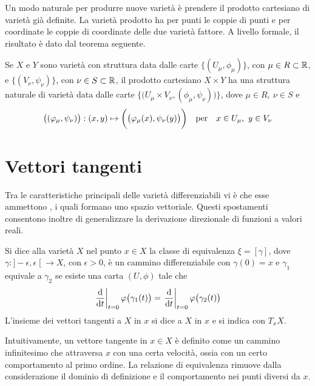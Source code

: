 Un modo naturale per produrre nuove varietà è prendere il prodotto cartesiano di varietà già definite. La varietà prodotto ha per punti le coppie di punti e per coordinate le coppie di coordinate delle due varietà fattore. A livello formale, il risultato è dato dal teorema seguente.
\begin{theorem}
  Se $X$ e $Y$ sono varietà con struttura data dalle carte $\big\lbrace(U_{\mu}, \phi_{\mu})\big\rbrace$, con $\mu \in R \subset \mathbb{R}$, e $\big\lbrace (V_{\nu}, \psi_{\nu})\big\rbrace$, con $\nu \in S \subset  \mathbb{R}$, il prodotto cartesiano $X \times Y$ ha una struttura naturale di varietà data dalle carte $\Big\lbrace\big( U_{\mu} \times V_{\nu}, (\phi_{\mu},\psi_{\nu})\big)\Big\rbrace$, dove $\mu \in  R,\ \nu \in S$ e \begin{equation*}
    \big((\phi_{\mu},\psi_{\nu})\big): (x,y) \mapsto \bigg(\big(\phi_{\mu}(x),\psi_{\nu}(y)\big)\bigg) \qqtext{per} x \in U_{\mu},\ y \in  V_{\nu}
  \end{equation*} 
\end{theorem}

\section{Vettori tangenti}
Tra le caratteristiche principali delle varietà differenziabili vi è che esse ammettono , i quali formano uno spazio vettoriale. Questi spostamenti consentono inoltre di generalizzare la derivazione direzionale di funzioni a valori reali.

\begin{definition}
  Si dice  alla varietà $X$ nel punto $x \in  X$ la classe di equivalenza $\xi =[\gamma]$, dove $\gamma:]-\epsilon,\epsilon\;[\ \to X$, con $\epsilon > 0$, è un cammino differenziabile con $\gamma(0) = x$ e $\gamma_1$ equivale a $\gamma_2$ se esiste una carta $(U, \phi)$ tale che \begin{equation*}
  \eval{\dv{t}}_{t=0} \phi \big(\gamma_1(t)\big) = \eval{\dv{t}}_{t=0} \phi\big(\gamma_2(t)\big)
  \end{equation*} 
  L'insieme dei vettori tangenti a $X$ in $x$ si dice  a $X$ in $x$ e si indica con $T_x X$.
\end{definition}
\begin{remark}
  Intuitivamente, un vettore tangente in $x \in X$ è definito come un cammino infinitesimo che attraversa $x$ con una certa velocità, ossia con un certo comportamento al primo ordine. La relazione di equivalenza rimuove dalla considerazione il dominio di definizione e il comportamento nei punti diversi da $x$.
\end{remark}

